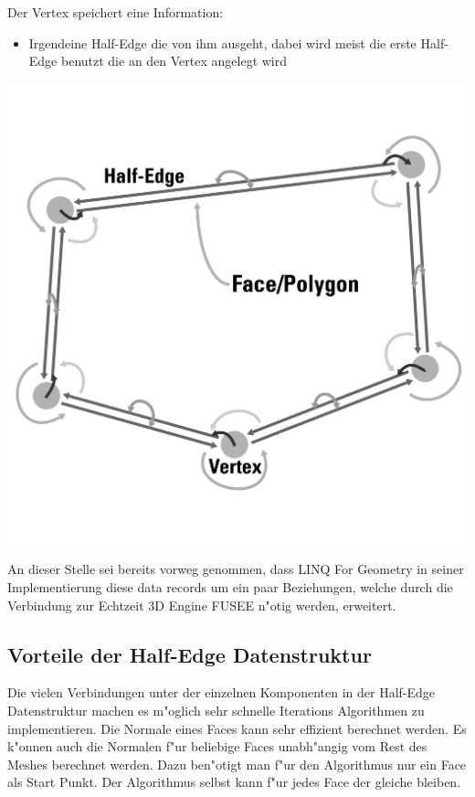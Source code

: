 \documentclass[pagesize, paper=a4, fontsize=12pt,titlepage=true, headings=small, headnosepline, abstractoff, liststotoc, nochapterprefix, plainheadsepline]{scrreprt}
\newcommand{\LFGS}{LINQ For Geometry }
\newcommand{\HES}{Half-Edge Datenstruktur }
\begin{document}
Der Vertex speichert eine Information:
\begin{itemize}
\item Irgendeine Half-Edge die von ihm ausgeht, dabei wird meist die erste Half-Edge benutzt die an den Vertex angelegt wird
\end{itemize}

\includegraphics[width=\linewidth]{../Bilder/hesBeziehungen}
\label{pic:polyConnections} 

An dieser Stelle sei bereits vorweg genommen, dass \LFGS in seiner Implementierung diese data records um ein paar Beziehungen, welche durch die Verbindung zur Echtzeit 3D Engine FUSEE n"otig werden, erweitert.

		\subsection {Vorteile der \HES}
			Die vielen Verbindungen unter der einzelnen Komponenten in der \HES machen es m"oglich sehr schnelle Iterations Algorithmen zu implementieren. Die Normale eines Faces kann sehr effizient berechnet werden. Es k"onnen auch die Normalen f"ur beliebige Faces unabh"angig vom Rest des Meshes berechnet werden. Dazu ben"otigt man f"ur den Algorithmus nur ein Face als Start Punkt. Der Algorithmus selbst kann f"ur jedes Face der gleiche bleiben.
\end{document}
